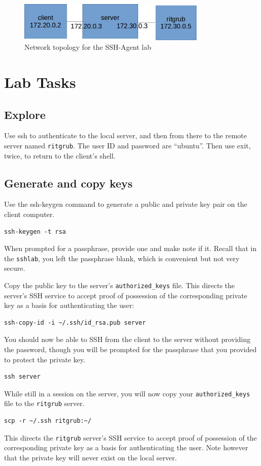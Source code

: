\begin{figure}[H]
\begin{center}
\includegraphics [width=0.8\textwidth]{ssh-agent.jpg}
\end{center}
\caption{Network topology for the SSH-Agent lab}
\label{fig:topology}
\end{figure}

\section{Lab Tasks}
\subsection{Explore}
Use ssh to authenticate to the local server, and then from there to the
remote server named {\tt ritgrub}.  The user ID and password are ``ubuntu''.
Then use exit, twice, to return to the client's shell.

\subsection{Generate and copy keys}
Use the ssh-keygen command to generate a public and private key pair on the client computer.
\begin{verbatim}
ssh-keygen -t rsa
\end{verbatim}
\noindent When prompted for a passphrase, provide one and make note if it.  Recall
that in the {\tt sshlab}, you left the passphrase blank, which is convenient but
not very secure.

Copy the public key to the server's {\tt authorized\_keys} file.  This directs the
server's SSH service to accept proof of possession of the corresponding private key as a
basis for authenticating the user:
\begin{verbatim}
ssh-copy-id -i ~/.ssh/id_rsa.pub server
\end{verbatim}

You should now be able to SSH from the client to the server without providing the password,
though you will be prompted for the passphrase that you provided to protect the private key.
\begin{verbatim}
ssh server
\end{verbatim}
\noindent While still in a session on the server, you will now copy your {\tt authorized\_keys}
file to the {\tt ritgrub} server.
\begin{verbatim}
scp -r ~/.ssh ritgrub:~/
\end{verbatim}
\noindent This directs the {\tt ritgrub} server's
SSH service to accept proof of possession of the corresponding private key as a
basis for authenticating the user.  Note however that the private key will never exist
on the local server.

